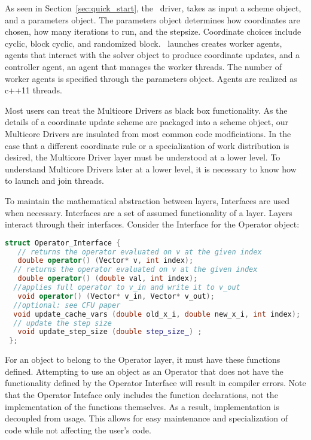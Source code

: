 As seen in Section~\ref{sec:quick_start}, the \pkg~driver, takes as input a scheme object, and a parameters object.
The parameters object determines how coordinates are chosen, how many iterations to run, and the stepsize.
Coordinate choices include cyclic, block cyclic, and randomized block. 
\pkg~launches creates  worker agents, agents that interact with the solver object to produce coordinate updates, and a controller agent, an agent that manages the worker threads.
The number of worker agents is specified through the parameters object.
Agents are realized as c++11 threads.

Most users can treat the Multicore Drivers as black box functionality.
As the details of a coordinate update scheme are packaged into a scheme object, our Multicore Drivers are insulated from most common code modficiations.
In the case that a different coordinate rule or a specialization of work distribution is desired, the Multicore Driver layer must be understood at a lower level.
To understand  Multicore Drivers later at a lower level, it is necessary to know how to launch and join threads.










To maintain the mathematical abstraction between layers, Interfaces are used when necessary. 
Interfaces are a set of assumed functionality of a layer.
Layers interact through their interfaces.
Consider the Interface for the Operator object:

\begin{lstlisting}[language=C++,label={Operator_Interface}]
struct Operator_Interface {
   // returns the operator evaluated on v at the given index
   double operator() (Vector* v, int index);
  // returns the operator evaluated on v at the given index
   double operator() (double val, int index);
  //applies full operator to v_in and write it to v_out
   void operator() (Vector* v_in, Vector* v_out);
  //optional: see CFU paper
  void update_cache_vars (double old_x_i, double new_x_i, int index);
  // update the step size
   void update_step_size (double step_size_) ;
 };
\end{lstlisting}

For an object to belong to the Operator layer, it must have these functions defined.
Attempting to use an object as an Operator that does not have the functionality defined by the Operator Interface will result in compiler errors.
Note that the Operator Inteface only includes the function declarations, not the implementation of the functions themselves.
As a result, implementation is decoupled from usage.
This allows for easy maintenance and specialization of code while not affecting the user's code.

